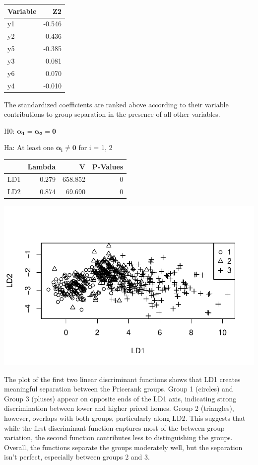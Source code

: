 \documentclass[
  letterpaper,
  DIV=11,
  numbers=noendperiod]{scrartcl}
\begin{document}
\begin{longtable}[]{@{}lr@{}}
\toprule\noalign{}
Variable & Z2 \\
\midrule\noalign{}
\endhead
\bottomrule\noalign{}
\endlastfoot
y1 & -0.546 \\
y2 & 0.436 \\
y5 & -0.385 \\
y3 & 0.081 \\
y6 & 0.070 \\
y4 & -0.010 \\
\end{longtable}

The standardized coefficients are ranked above according to their
variable contributions to group separation in the presence of all other
variables.

H0: \(\pmb{\alpha_1} = \pmb{\alpha_2} = \pmb{0}\)

Ha: At least one \(\pmb{\alpha_i} \neq \pmb{0}\) for i = 1, 2

\begin{longtable}[]{@{}lrrr@{}}
\toprule\noalign{}
& Lambda & V & P-Values \\
\midrule\noalign{}
\endhead
\bottomrule\noalign{}
\endlastfoot
LD1 & 0.279 & 658.852 & 0 \\
LD2 & 0.874 & 69.690 & 0 \\
\end{longtable}

\includegraphics{final_project_files/figure-pdf/unnamed-chunk-16-1.pdf}

The plot of the first two linear discriminant functions shows that LD1
creates meaningful separation between the Pricerank groups. Group 1
(circles) and Group 3 (pluses) appear on opposite ends of the LD1 axis,
indicating strong discrimination between lower and higher priced homes.
Group 2 (triangles), however, overlaps with both groups, particularly
along LD2. This suggests that while the first discriminant function
captures most of the between group variation, the second function
contributes less to distinguishing the groups. Overall, the functions
separate the groups moderately well, but the separation isn't perfect,
especially between groups 2 and 3.
\end{document}
